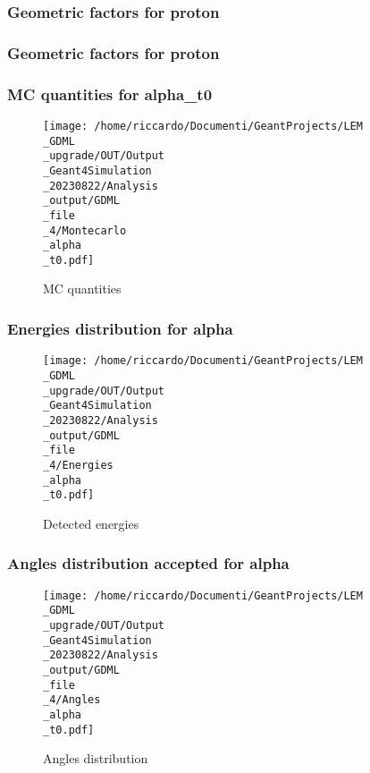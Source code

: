 \documentclass[8pt]{beamer}
\begin{document}
            \begin{frame}
                \frametitle{Geometric factors for proton}
            
            \end{frame}
            
            \begin{frame}
                \frametitle{Geometric factors for proton}
            
            \end{frame}
            
            \begin{frame}
                \frametitle{MC quantities for alpha\_t0}
            
        \begin{figure}[h]
            \centering
            \texttt{[image: /home/riccardo/Documenti/GeantProjects/LEM\\\_GDML\\\_upgrade/OUT/Output\\\_Geant4Simulation\\\_20230822/Analysis\\\_output/GDML\\\_file\\\_4/Montecarlo\\\_alpha\\\_t0.pdf]}
            \caption{MC quantities}
        \end{figure}
        
            \end{frame}
            
            \begin{frame}
                \frametitle{Energies distribution for alpha}
            
        \begin{figure}[h]
            \centering
            \texttt{[image: /home/riccardo/Documenti/GeantProjects/LEM\\\_GDML\\\_upgrade/OUT/Output\\\_Geant4Simulation\\\_20230822/Analysis\\\_output/GDML\\\_file\\\_4/Energies\\\_alpha\\\_t0.pdf]}
            \caption{Detected energies}
        \end{figure}
        
            \end{frame}
            
            \begin{frame}
                \frametitle{Angles distribution accepted for alpha}
            
        \begin{figure}[h]
            \centering
            \texttt{[image: /home/riccardo/Documenti/GeantProjects/LEM\\\_GDML\\\_upgrade/OUT/Output\\\_Geant4Simulation\\\_20230822/Analysis\\\_output/GDML\\\_file\\\_4/Angles\\\_alpha\\\_t0.pdf]}
            \caption{Angles distribution}
        \end{figure}
        
            \end{frame}
            
\end{document}
